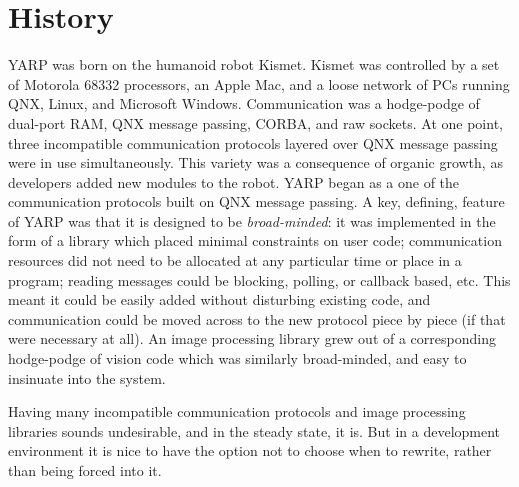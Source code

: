 
\section{History}

YARP was born on the humanoid robot Kismet.  Kismet was controlled by
a set of Motorola 68332 processors, an Apple Mac, and a loose network
of PCs running QNX, Linux, and Microsoft Windows.  Communication was a
hodge-podge of dual-port RAM, QNX message passing, CORBA, and raw
sockets.  At one point, three incompatible communication protocols
layered over QNX message passing were in use simultaneously.  This
variety was a consequence of organic growth, as developers added new
modules to the robot.  YARP began as a one of the communication
protocols built on QNX message passing.  A key, defining, feature of
YARP was that it is designed to be {\em broad-minded}: it was
implemented in the form of a library which placed minimal constraints
on user code; communication resources did not need to be allocated at
any particular time or place in a program; reading messages could be
blocking, polling, or callback based, etc. This meant it could be
easily added without disturbing existing code, and communication could
be moved across to the new protocol piece by piece (if that were
necessary at all).  An image processing library grew out
of a corresponding hodge-podge of vision code which was
similarly broad-minded, and easy to insinuate into the system.

Having many incompatible communication protocols and image 
processing libraries sounds undesirable, and in the 
steady state, it is.  But in a development environment
it is nice to have the option not to choose when to
rewrite, rather than being forced into it.




